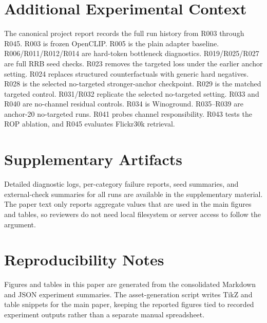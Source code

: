\section{Additional Experimental Context}

The canonical project report records the full run history from R003 through R045. R003 is frozen OpenCLIP. R005 is the plain adapter baseline. R006/R011/R012/R014 are hard-token bottleneck diagnostics. R019/R025/R027 are full RRB seed checks. R023 removes the targeted loss under the earlier anchor setting. R024 replaces structured counterfactuals with generic hard negatives. R028 is the selected no-targeted stronger-anchor checkpoint. R029 is the matched targeted control. R031/R032 replicate the selected no-targeted setting. R033 and R040 are no-channel residual controls. R034 is Winoground. R035--R039 are anchor-20 no-targeted runs. R041 probes channel responsibility. R043 tests the ROP ablation, and R045 evaluates Flickr30k retrieval.

\section{Supplementary Artifacts}

Detailed diagnostic logs, per-category failure reports, seed summaries, and external-check summaries for all runs are available in the supplementary material. The paper text only reports aggregate values that are used in the main figures and tables, so reviewers do not need local filesystem or server access to follow the argument.

\section{Reproducibility Notes}

Figures and tables in this paper are generated from the consolidated Markdown and JSON experiment summaries. The asset-generation script writes TikZ and table snippets for the main paper, keeping the reported figures tied to recorded experiment outputs rather than a separate manual spreadsheet.
